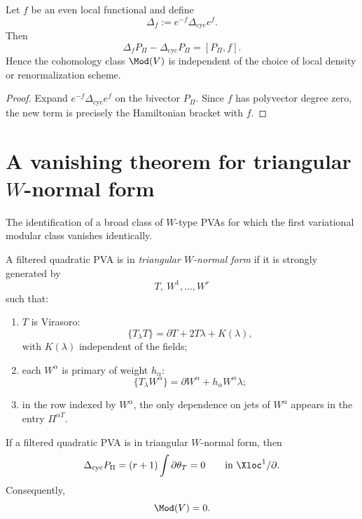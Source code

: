 \begin{lemma}\label{lem:gaugeind}
Let $f$ be an even local functional and define
\[
\Delta_f:=e^{-f}\Delta_{\mathrm{cyc}}e^f.
\]
Then
\[
\Delta_fP_\Pi-\Delta_{\mathrm{cyc}}P_\Pi=[P_\Pi,f].
\]
Hence the cohomology class $\Mod(V)$ is independent of the choice of local density
or renormalization scheme.
\end{lemma}

\begin{proof}
Expand $e^{-f}\Delta_{\mathrm{cyc}}e^f$ on the bivector $P_\Pi$. Since $f$ has polyvector
degree zero, the new term is precisely the Hamiltonian bracket with $f$.
\end{proof}

\section{A vanishing theorem for triangular $W$-normal form}

The identification of a broad class of $W$-type PVAs for which the first variational modular
class vanishes identically.

\begin{definition}
A filtered quadratic PVA is in \emph{triangular $W$-normal form} if it is strongly
generated by
\[
T,\ W^1,\dots,W^r
\]
such that:
\begin{enumerate}[leftmargin=2.4em]
\item $T$ is Virasoro:
\[
\{T_\lambda T\}=\partial T+2T\lambda+K(\lambda),
\]
with $K(\lambda)$ independent of the fields;
\item each $W^\alpha$ is primary of weight $h_\alpha$:
\[
\{T_\lambda W^\alpha\}=\partial W^\alpha+h_\alpha W^\alpha\lambda;
\]
\item in the row indexed by $W^\alpha$, the only dependence on jets of $W^\alpha$
appears in the entry $\Pi^{\alpha T}$.
\end{enumerate}
\end{definition}

\begin{theorem}\label{thm:triangular-vanishing}
If a filtered quadratic PVA is in triangular $W$-normal form, then
\[
\Delta_{\mathrm{cyc}}P_\Pi=(r+1)\int \partial\theta_T=0
\qquad\text{in }\Xloc^1/\partial.
\]
Consequently,
\[
\Mod(V)=0.
\]
\end{theorem}

